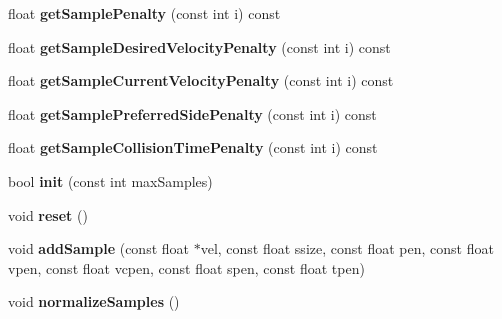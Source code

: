 \begin{DoxyCompactItemize}
\mbox{\label{classdtObstacleAvoidanceDebugData_a3bde3898f9ed1ada5e487010e502e4fd}} 
float {\bfseries get\+Sample\+Penalty} (const int i) const
\item 
\mbox{\label{classdtObstacleAvoidanceDebugData_aa18a04d3c916740d7ddbd8d747de4e0f}} 
float {\bfseries get\+Sample\+Desired\+Velocity\+Penalty} (const int i) const
\item 
\mbox{\label{classdtObstacleAvoidanceDebugData_ae6bce4f174195e5b114a79c13fc46c02}} 
float {\bfseries get\+Sample\+Current\+Velocity\+Penalty} (const int i) const
\item 
\mbox{\label{classdtObstacleAvoidanceDebugData_a54805fdf39b6fb3d294c0610f051b1a0}} 
float {\bfseries get\+Sample\+Preferred\+Side\+Penalty} (const int i) const
\item 
\mbox{\label{classdtObstacleAvoidanceDebugData_a57737b7b4d07179326e69c70032a9f71}} 
float {\bfseries get\+Sample\+Collision\+Time\+Penalty} (const int i) const
\item 
\mbox{\label{classdtObstacleAvoidanceDebugData_a49f4c177709ecccc77331e1b43ae893c}} 
bool {\bfseries init} (const int max\+Samples)
\item 
\mbox{\label{classdtObstacleAvoidanceDebugData_a2e7d802ea941ad37d5244af91c47f0c9}} 
void {\bfseries reset} ()
\item 
\mbox{\label{classdtObstacleAvoidanceDebugData_a54b01ec0a47c6efd95ebde459791b788}} 
void {\bfseries add\+Sample} (const float $\ast$vel, const float ssize, const float pen, const float vpen, const float vcpen, const float spen, const float tpen)
\item 
\mbox{\label{classdtObstacleAvoidanceDebugData_aae878af7168a5683cf05cd6f3f9b4cfe}} 
void {\bfseries normalize\+Samples} ()
\item 
\mbox{\label{classdtObstacleAvoidanceDebugData_a48f21bd0b2d2f591290e127b00953ec2}} 

\end{DoxyCompactItemize}
